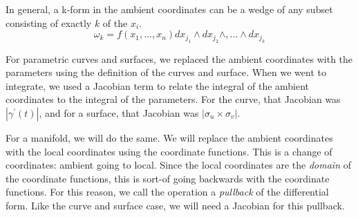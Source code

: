 \documentclass[fleqn,letterpaper]{report}
\begin{document}
In general, a k-form in the ambient coordinates can be a wedge
of any subset consisting of exactly $k$ of the $x_i$.
\begin{equation*}
\omega_k = f(x_1, \ldots, x_n) dx_{j_1} \wedge dx_{j_2} \wedge, \ldots
\wedge dx_{j_k}
\end{equation*}

For parametric curves and surfaces, we replaced the ambient
coordinates with the parameters using the definition of the
curves and surface. When we went to integrate, we used a
Jacobian term to relate the integral of the ambient
coordinates to the integral of the parameters. For the curve,
that Jacobian was $|\gamma^\prime(t)|$, and for a surface,
that Jacobian was $|\sigma_u \times \sigma_v|$. 

For a manifold, we will do the same. We will replace the
ambient coordinates with the local coordinates using the
coordinate functions. This is a change of coordinates: ambient
going to local. Since the local coordinates are the
\emph{domain} of the coordinate functions, this is sort-of
going backwards with the coordinate functions. For this
reason, we call the operation a \emph{pullback} of the
differential form. Like the curve and surface case, we will
need a Jacobian for this pullback. 
\end{document}
